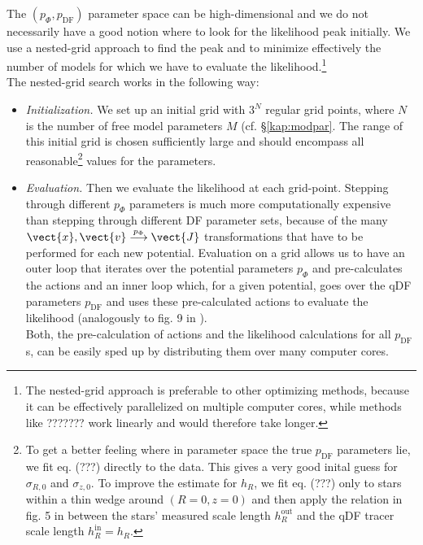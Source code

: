 The $(p_\Phi,p_\text{DF})$ parameter space can be high-dimensional and we do not necessarily have a good notion where to look for the likelihood peak initially. We use a nested-grid approach to find the peak and to minimize effectively the number of models for which we have to evaluate the likelihood.\footnote{The nested-grid approach is preferable to other optimizing methods, because it can be effectively parallelized on multiple computer cores, while methods like ??????? work linearly and would therefore take longer.}
\\The nested-grid search works in the following way: 
\begin{itemize}

\item \emph{Initialization.} We set up an initial grid with $3^N$ regular grid points, where $N$ is the number of free model parameters $M$ (cf. \S\ref{kap:modpar}. The range of this initial grid is chosen sufficiently large and should encompass all reasonable\footnote{To get a better feeling where in parameter space the true $p_\text{DF}$ parameters lie, we fit eq. (???) directly to the data. This gives a very good inital guess for $\sigma_{R,0}$ and $\sigma_{z,0}$. To improve the estimate for $h_R$, we fit eq. (???) only to stars within a thin wedge around $(R=0,z=0)$ and then apply the relation in fig. 5 in \citet{bov13} between the stars' measured scale length $h_R^\text{out}$ and the qDF tracer scale length $h_R^\text{in}=h_R$.} values for the parameters. 

\item  \emph{Evaluation.} Then we evaluate the likelihood at each grid-point. Stepping through different $p_\Phi$ parameters is much more computationally expensive than stepping through different DF parameter sets, because of the many $\vect{x},\vect{v} \overset{p_\Phi}{\longrightarrow} \vect{J}$ transformations that have to be performed for each new potential. Evaluation on a grid allows us to have an outer loop that iterates over the potential parameters $p_\Phi$ and pre-calculates the actions and an inner loop which, for a given potential, goes over the qDF parameters $p_\text{DF}$ and uses these pre-calculated actions to evaluate the likelihood (analogously to fig. 9 in \citet{bov13}).
\\Both, the pre-calculation of actions and the likelihood calculations for all $p_\text{DF}$s, can be easily sped up by distributing them over many computer cores.


\end{itemize}
